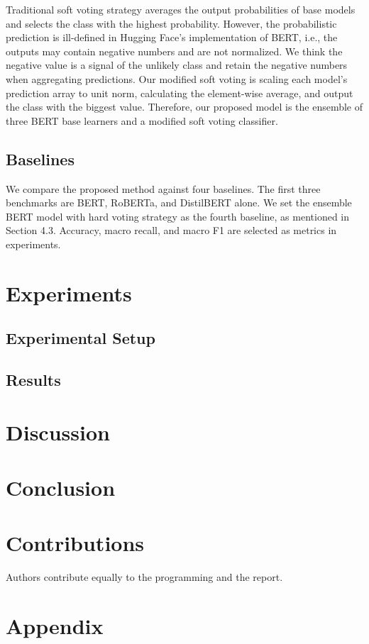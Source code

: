 \documentclass[runningheads]{llncs}
\begin{document}
Traditional soft voting strategy averages the output probabilities of base models and selects the class with the highest probability. However, the probabilistic prediction is ill-defined in Hugging Face's implementation of BERT, i.e., the outputs may contain negative numbers and are not normalized. We think the negative value is a signal of the unlikely class and retain the negative numbers when aggregating predictions. Our modified soft voting is scaling each model's prediction array to unit norm, calculating the element-wise average, and output the class with the biggest value. Therefore, our proposed model is the ensemble of three BERT base learners and a modified soft voting classifier.

\subsection{Baselines}

We compare the proposed method against four baselines. The first three benchmarks are BERT, RoBERTa, and DistilBERT alone. We set the ensemble BERT model with hard voting strategy as the fourth baseline, as mentioned in Section 4.3. Accuracy, macro recall, and macro F1 are selected as metrics in experiments.

\section{Experiments}
\subsection{Experimental Setup}

\subsection{Results}

\section{Discussion}
    
\section{Conclusion}
    
\section{Contributions}
Authors contribute equally to the programming and the report.

%
%


%

\section*{Appendix}
\end{document}
